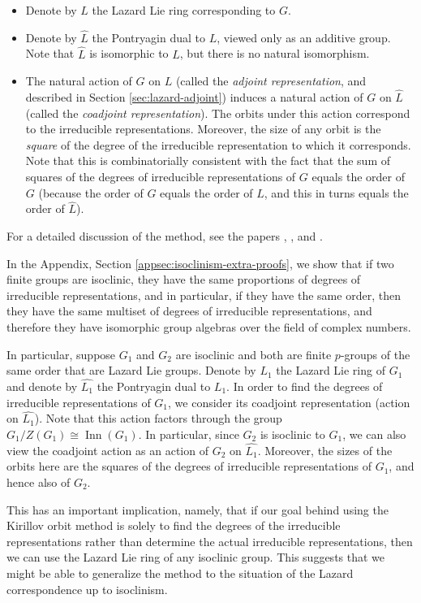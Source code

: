 \begin{itemize}
\item Denote by $L$ the Lazard Lie ring corresponding to $G$.
\item Denote by $\hat{L}$ the Pontryagin dual to $L$, viewed only as
  an additive group. Note that $\hat{L}$ is isomorphic to $L$, but
  there is no natural isomorphism.
\item The natural action of $G$ on $L$ (called the {\em adjoint
  representation}, and described in Section \ref{sec:lazard-adjoint})
  induces a natural action of $G$ on $\hat{L}$ (called the {\em
    coadjoint representation}). The orbits under this action correspond
  to the irreducible representations. Moreover, the size of any orbit
  is the {\em square} of the degree of the irreducible representation
  to which it corresponds. Note that this is combinatorially
  consistent with the fact that the sum of squares of the degrees of
  irreducible representations of $G$ equals the order of $G$ (because
  the order of $G$ equals the order of $L$, and this in turns equals
  the order of $\hat{L}$).
\end{itemize}

For a detailed discussion of the method, see the papers
\cite{GonzalezSanchez}, \cite{BoyarchenkoSabitova}, and
\cite{enumeratingcharacters}.

In the Appendix, Section \ref{appsec:isoclinism-extra-proofs}, we show
that if two finite groups are isoclinic, they have the same
proportions of degrees of irreducible representations, and in
particular, if they have the same order, then they have the same
multiset of degrees of irreducible representations, and therefore they
have isomorphic group algebras over the field of complex numbers.

In particular, suppose $G_1$ and $G_2$ are isoclinic and both are
finite $p$-groups of the same order that are Lazard Lie groups. Denote
by $L_1$ the Lazard Lie ring of $G_1$ and denote by $\hat{L_1}$ the
Pontryagin dual to $L_1$. In order to find the degrees of irreducible
representations of $G_1$, we consider its coadjoint representation
(action on $\hat{L_1}$). Note that this action factors through the
group $G_1/Z(G_1) \cong \operatorname{Inn}(G_1)$. In particular, since
$G_2$ is isoclinic to $G_1$, we can also view the coadjoint action as
an action of $G_2$ on $\hat{L_1}$. Moreover, the sizes of the orbits
here are the squares of the degrees of irreducible representations of
$G_1$, and hence also of $G_2$.

This has an important implication, namely, that if our goal behind
using the Kirillov orbit method is solely to find the degrees of the
irreducible representations rather than determine the actual
irreducible representations, then we can use the Lazard Lie ring of
any isoclinic group. This suggests that we might be able to generalize
the method to the situation of the Lazard correspondence up to
isoclinism.

